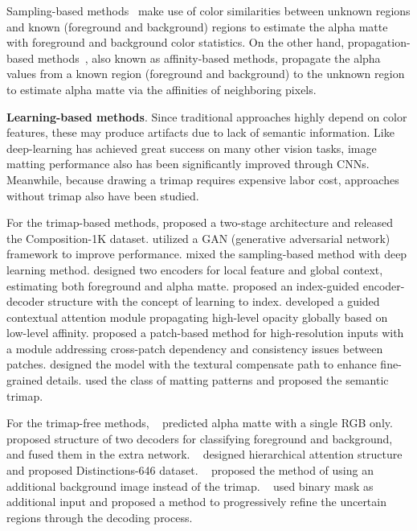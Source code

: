 \documentclass[10pt,twocolumn,letterpaper]{article}
\begin{document}
Sampling-based methods~\cite{gastal2010shared, chuang2001bayesian, he2011global, shahrian2013improving, wang2007optimized} make use of color similarities between unknown regions and known (foreground and background) regions to estimate the alpha matte with foreground and background color statistics.
On the other hand, propagation-based methods~\cite{chen2013knn, lee2011nonlocal, levin2007closed, levin2008spectral, he2010fast, sun2004poisson}, also known as affinity-based methods, propagate the alpha values from a known region (foreground and background) to the unknown region to estimate alpha matte via the affinities of neighboring pixels.

\textbf{Learning-based methods}. 
Since traditional approaches highly depend on color features, these may produce artifacts due to lack of semantic information. Like deep-learning has achieved great success on many other vision tasks, image matting performance also has been significantly improved through CNNs. Meanwhile, because drawing a trimap requires expensive labor cost, approaches without trimap also have been studied.

For the trimap-based methods,
\cite{xu2017deep} proposed a two-stage architecture and released the Composition-1K dataset.
\cite{lutz2018alphagan} utilized a GAN (generative adversarial network) framework to improve performance.
\cite{tang2019learning} mixed the sampling-based method with deep learning method.
\cite{hou2019context} designed two encoders for local feature and global context, estimating both foreground and alpha matte.
\cite{lu2019indices} proposed an index-guided encoder-decoder structure with the concept of learning to index.
\cite{li2020natural} developed a guided contextual attention module propagating high-level opacity globally based on low-level affinity.
\cite{yu2020high} proposed a patch-based method for high-resolution inputs with a module addressing cross-patch dependency and consistency issues between patches.
\cite{liu2021towards} designed the model with the textural compensate path to enhance fine-grained details.
\cite{sun2021semantic} used the class of matting patterns and proposed the semantic trimap.

For the trimap-free methods,
~\cite{zhang2019late, qiao2020attention} predicted alpha matte with a single RGB only.
~\cite{zhang2019late} proposed structure of two decoders for classifying foreground and background, and fused them in the extra network.
~\cite{qiao2020attention} designed hierarchical attention structure and  proposed Distinctions-646 dataset.
~\cite{sengupta2020background, lin2021real} proposed the method of using an additional background image instead of the trimap.
~\cite{yu2021mask} used binary mask as additional input and proposed a method to progressively refine the uncertain regions through the decoding process.
\end{document}
